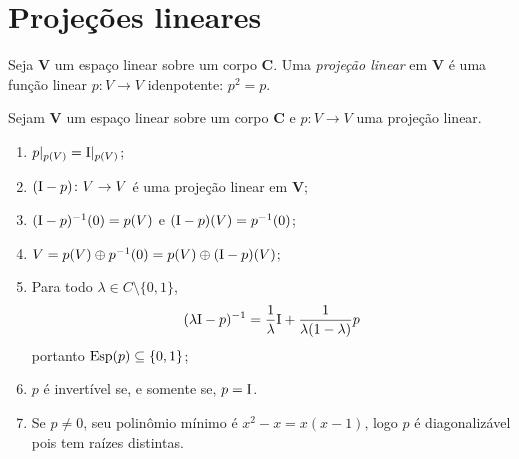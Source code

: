 \section{Projeções lineares}

\begin{definition}
Seja $\bm V$ um espaço linear sobre um corpo $\bm C$. Uma \emph{projeção linear} em $\bm V$ é uma função linear $p\colon V \to V$ idenpotente: $p^2=p$.
\end{definition}

\begin{proposition}
Sejam $\bm V$ um espaço linear sobre um corpo $\bm C$ e $p\colon V \to V$ uma projeção linear.
	\begin{enumerate}
	\item $p|_{p(V)} = \mathrm{I}|_{p(V)}$;
	
	\item $(\mathrm{I}-p) \colon V \to V$ é uma projeção linear em $\bm V$;
	
	\item $(\mathrm{I}-p)^{-1}(0) = p(V)$ e $(\mathrm{I}-p)(V) = p^{-1}(0)$;
	
	\item $V = p(V) \oplus p^{-1}(0) = p(V) \oplus (\mathrm{I}-p)(V)$;
	
	\item Para todo $\lambda \in C \setminus \{0,1\}$,
		\begin{equation*}
		(\lambda\mathrm{I}-p)^{-1} = \frac{1}{\lambda}\mathrm{I} + \frac{1}{\lambda(1-\lambda)}p
		\end{equation*}
portanto $\operatorname{Esp}(p) \subseteq \{0,1\}$;

	\item $p$ é invertível se, e somente se, $p=\mathrm{I}$.

	\item Se $p \neq 0$, seu polinômio mínimo é $x^2-x = x(x-1)$, logo $p$ é diagonalizável pois tem raízes distintas.
	\end{enumerate}
\end{proposition}
